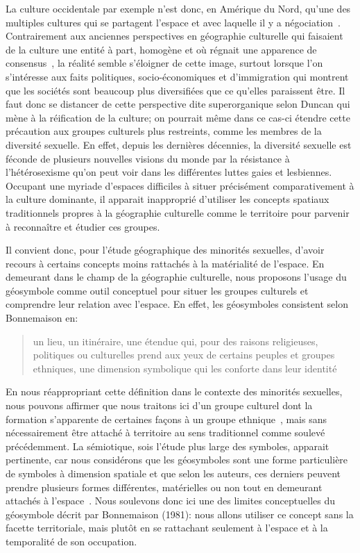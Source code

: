 La culture occidentale par exemple n'est donc, en Amérique du Nord, qu'une des multiples cultures qui se partagent l'espace et avec laquelle il y a négociation~\citep[11]{Duncan1993}. 
Contrairement aux anciennes perspectives en géographie culturelle qui faisaient de la culture une entité à part, homogène et où régnait une apparence de consensus~\citep{Duncan1980}, la réalité semble s'éloigner de cette image, surtout lorsque l'on s'intéresse aux faits politiques, socio-économiques et d'immigration qui montrent que les sociétés sont beaucoup plus diversifiées que ce qu'elles paraissent être. 
Il faut donc se distancer de cette perspective dite superorganique selon Duncan qui mène à la réification de la culture; on pourrait même dans ce cas-ci étendre cette précaution aux groupes culturels plus restreints, comme les membres de la diversité sexuelle. 
En effet, depuis les dernières décennies, la diversité sexuelle est féconde de plusieurs nouvelles visions du monde par la résistance à l'hétérosexisme qu'on peut voir dans les différentes luttes gaies et lesbiennes.
Occupant une myriade d'espaces difficiles à situer précisément comparativement à la culture dominante, il apparait inapproprié d'utiliser les concepts spatiaux traditionnels propres à la géographie culturelle comme le territoire pour parvenir à reconnaître et étudier ces groupes.

Il convient donc, pour l'étude géographique des minorités sexuelles, d'avoir recours à certains concepts moins rattachés à la matérialité de l'espace. 
En demeurant dans le champ de la géographie culturelle, nous proposons l'usage du géosymbole comme outil conceptuel pour situer les groupes culturels et comprendre leur relation avec l'espace. 
En effet, les géosymboles consistent selon Bonnemaison en: \blockquote[{\cite[256]{Bonnemaison1981}}][.]{\textelp{} un lieu, un   itinéraire, une étendue qui, pour des raisons religieuses, politiques ou   culturelles prend aux yeux de certains peuples et groupes ethniques, une   dimension symbolique qui les conforte dans leur identité }. 
En nous réappropriant cette définition dans le contexte des minorités sexuelles, nous pouvons affirmer que nous traitons ici d'un groupe culturel dont la formation s'apparente de certaines façons à un groupe ethnique~\citep{Sinfield1996}, mais sans nécessairement être attaché à territoire au sens traditionnel comme soulevé précédemment. 
La sémiotique, sois l'étude plus large des symboles, apparait pertinente, car nous considérons que les géosymboles sont une forme particulière de symboles à dimension spatiale et que selon les auteurs, ces derniers peuvent prendre plusieurs formes différentes, matérielles ou non tout en demeurant attachés à l'espace~\citep{Bonnemaison1981,Bedard2002}. 
Nous soulevons donc ici une des limites conceptuelles du géosymbole décrit par Bonnemaison (1981): nous allons utiliser ce concept sans la facette territoriale, mais plutôt en se rattachant seulement à l'espace et à la temporalité de son occupation.

